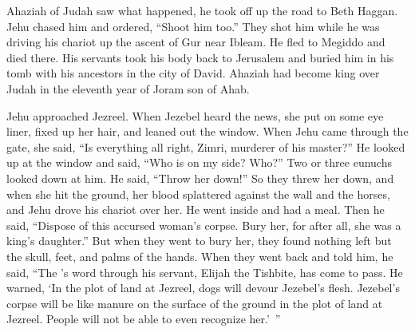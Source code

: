 {Ahaziah
of Judah
saw
what happened, he took off
up the road
to Beth Haggan. Jehu
chased
him and ordered,
“Shoot him too.”
They shot
him while he was driving his chariot
up the ascent
of Gur
near Ibleam.
He fled
to Megiddo
and died
there.
His servants
took
his body
back to Jerusalem
and buried
him in his tomb
with
his ancestors
in the city
of David.
Ahaziah
had become king
over
Judah
in the eleventh
year
of Joram
son
of Ahab.
\par }{\PP {}Jehu
approached
Jezreel.
When Jezebel
heard
the news, she put
on some eye
liner,
fixed up
her hair,
and leaned out
the window.
When Jehu
came
through the gate,
she said,
“Is everything
all right, Zimri,
murderer
of his master?”
He looked
up at
the window
and said,
“Who
is on my side? Who?” Two
or three
eunuchs
looked
down at him.
He said,
“Throw
her down!” So they threw
her down,
and when
she hit the ground,
her blood
splattered against the wall
and the horses, and Jehu drove his chariot over her.
He went
inside and had a meal.
Then he said,
“Dispose
of this
accursed
woman’s corpse. Bury
her, for
after all, she was a king’s
daughter.”
But when they went
to bury
her, they found
nothing
left but
the skull,
feet,
and palms
of the hands.
When they went back
and told
him, he said,
“The
{}’s
word
through
his servant,
Elijah
the Tishbite,
has come to pass. He warned, ‘In the plot
of land at Jezreel,
dogs
will devour
Jezebel’s
flesh.
Jezebel’s
corpse
will be
like manure
on
the surface
of the ground
in the plot
of land at Jezreel.
People
will not
be able to even recognize
her.’ ”

}
